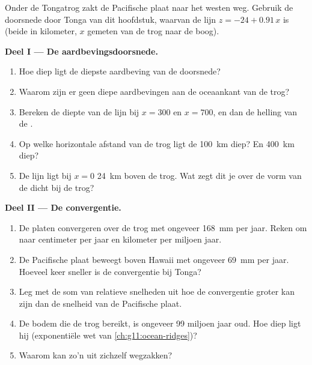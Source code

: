 \begin{problem}
\label{pb:g11:subduction-zones:1}
Onder de Tongatrog zakt de Pacifische plaat naar het westen weg. Gebruik de doorsnede
door Tonga van dit hoofdstuk, waarvan de lijn $z = -24 + 0.91\,x$ is (beide in
kilometer, $x$ gemeten van de trog naar de boog).

\medskip
\noindent\textbf{Deel I --- De aardbevingsdoorsnede.}
\begin{enumerate}
  \item Hoe diep ligt de diepste aardbeving van de doorsnede?
  \item Waarom zijn er geen diepe aardbevingen aan de oceaankant van de trog?
  \item Bereken de diepte van de lijn bij $x = 300$ en $x = 700$, en dan de
        helling van de .
  \item Op welke horizontale afstand van de trog ligt de 
        \qty{100}{km} diep? En \qty{400}{km} diep?
  \item De lijn ligt bij $x = 0$ \qty{24}{km} boven de trog. Wat zegt
        dit je over de vorm van de  dicht bij de trog?
\end{enumerate}

\medskip
\noindent\textbf{Deel II --- De convergentie.}
\begin{enumerate}[resume]
  \item De platen convergeren over de trog met ongeveer \qty{168}{mm} per jaar.
        Reken om naar centimeter per jaar en kilometer per miljoen jaar.
  \item De Pacifische plaat beweegt boven Hawaii met ongeveer \qty{69}{mm} per jaar.
        Hoeveel keer sneller is de convergentie bij Tonga?
  \item Leg met de som van relatieve snelheden uit hoe de convergentie
        groter kan zijn dan de snelheid van de Pacifische plaat.
  \item De bodem die de trog bereikt, is ongeveer 99 miljoen jaar oud. Hoe
        diep ligt hij (exponentiële wet van \cref{ch:g11:ocean-ridges})?
  \item Waarom kan zo'n  uit zichzelf wegzakken?
\end{enumerate}


\end{problem}
